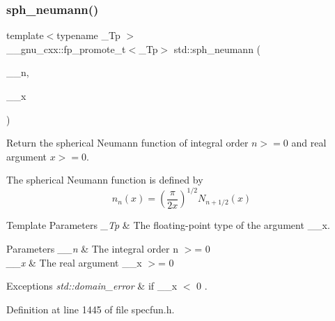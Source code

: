 \subsubsection{\texorpdfstring{sph\+\_\+neumann()}{sph\_neumann()}}
{\footnotesize\ttfamily template$<$typename \+\_\+\+Tp $>$ \\
\+\_\+\+\_\+gnu\+\_\+cxx\+::fp\+\_\+promote\+\_\+t$<$\+\_\+\+Tp$>$ std\+::sph\+\_\+neumann (\begin{DoxyParamCaption}\item[{unsigned int}]{\+\_\+\+\_\+n,  }\item[{\+\_\+\+Tp}]{\+\_\+\+\_\+x }\end{DoxyParamCaption})\hspace{0.3cm}{\ttfamily [inline]}}

Return the spherical Neumann function of integral order $ n >= 0 $ and real argument $ x >= 0 $.

The spherical Neumann function is defined by \[ n_n(x) = \left(\frac{\pi}{2x} \right) ^{1/2} N_{n+1/2}(x) \]


\begin{DoxyTemplParams}{Template Parameters}
{\em \+\_\+\+Tp} & The floating-\/point type of the argument {\ttfamily \+\_\+\+\_\+x}. \\
\hline
\end{DoxyTemplParams}

\begin{DoxyParams}{Parameters}
{\em \+\_\+\+\_\+n} & The integral order {\ttfamily  n $>$= 0 } \\
\hline
{\em \+\_\+\+\_\+x} & The real argument {\ttfamily  \+\_\+\+\_\+x $>$= 0 } \\
\hline
\end{DoxyParams}

\begin{DoxyExceptions}{Exceptions}
{\em std\+::domain\+\_\+error} & if {\ttfamily  \+\_\+\+\_\+x $<$ 0 }. \\
\hline
\end{DoxyExceptions}


Definition at line 1445 of file specfun.\+h.

\mbox{\label{group__mathsf__std_ga789143122fa99536329bc2d1b1aac2f0}} 
